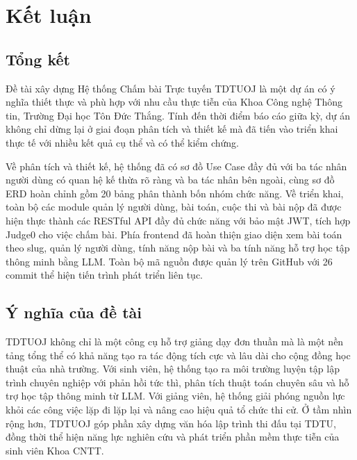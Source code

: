 \documentclass[12pt, a4paper]{report}
\begin{document}
\chapter{Kết luận}

\section{Tổng kết}

Đề tài xây dựng Hệ thống Chấm bài Trực tuyến TDTUOJ là một dự án có ý nghĩa thiết thực và phù hợp với nhu cầu thực tiễn của Khoa Công nghệ Thông tin, Trường Đại học Tôn Đức Thắng. Tính đến thời điểm báo cáo giữa kỳ, dự án không chỉ dừng lại ở giai đoạn phân tích và thiết kế mà đã tiến vào triển khai thực tế với nhiều kết quả cụ thể và có thể kiểm chứng.

Về phân tích và thiết kế, hệ thống đã có sơ đồ Use Case đầy đủ với ba tác nhân người dùng có quan hệ kế thừa rõ ràng và ba tác nhân bên ngoài, cùng sơ đồ \ac{ERD} hoàn chỉnh gồm 20 bảng phân thành bốn nhóm chức năng. Về triển khai, toàn bộ các module quản lý người dùng, bài toán, cuộc thi và bài nộp đã được hiện thực thành các \ac{REST}ful \ac{API} đầy đủ chức năng với bảo mật \ac{JWT}, tích hợp Judge0 cho việc chấm bài. Phía frontend đã hoàn thiện giao diện xem bài toán theo slug, quản lý người dùng, tính năng nộp bài và ba tính năng hỗ trợ học tập thông minh bằng \ac{LLM}. Toàn bộ mã nguồn được quản lý trên GitHub với 26 commit thể hiện tiến trình phát triển liên tục.

\section{Ý nghĩa của đề tài}

TDTUOJ không chỉ là một công cụ hỗ trợ giảng dạy đơn thuần mà là một nền tảng tổng thể có khả năng tạo ra tác động tích cực và lâu dài cho cộng đồng học thuật của nhà trường. Với sinh viên, hệ thống tạo ra môi trường luyện tập lập trình chuyên nghiệp với phản hồi tức thì, phân tích thuật toán chuyên sâu và hỗ trợ học tập thông minh từ \ac{LLM}. Với giảng viên, hệ thống giải phóng nguồn lực khỏi các công việc lặp đi lặp lại và nâng cao hiệu quả tổ chức thi cử. Ở tầm nhìn rộng hơn, TDTUOJ góp phần xây dựng văn hóa lập trình thi đấu tại \ac{TDTU}, đồng thời thể hiện năng lực nghiên cứu và phát triển phần mềm thực tiễn của sinh viên Khoa \ac{CNTT}.

\newpage
\nocite{*}
\printbibliography[
  title   = {TÀI LIỆU THAM KHẢO},
  heading = bibintoc,
]
\end{document}
